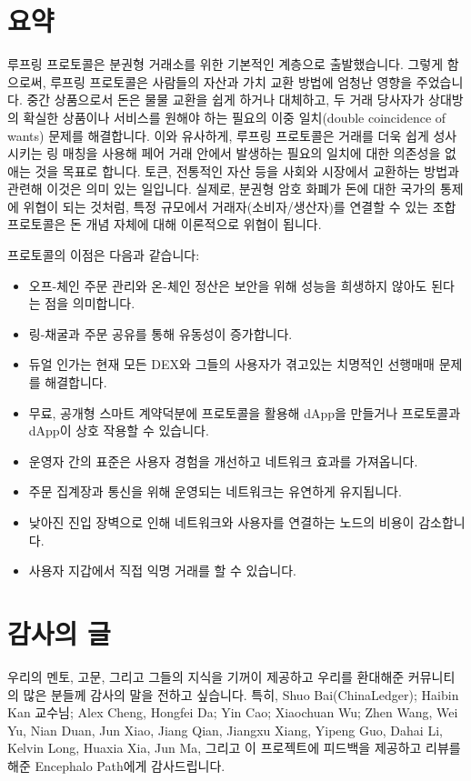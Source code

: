 \documentclass[UTF8,nofonts]{article}
\begin{document}
\begin{multicols}{2}
\section{요약}

루프링 프로토콜은 분권형 거래소를 위한 기본적인 계층으로 출발했습니다. 그렇게 함으로써, 루프링 프로토콜은 사람들의 자산과 가치 교환 방법에 엄청난 영향을 주었습니다. 중간 상품으로서 돈은 물물 교환을 쉽게 하거나 대체하고, 두 거래 당사자가 상대방의 확실한 상품이나 서비스를 원해야 하는 필요의 이중 일치(double coincidence of wants) 문제\cite{unenumerated2006}를 해결합니다. 이와 유사하게, 루프링 프로토콜은 거래를 더욱 쉽게 성사시키는 링 매칭을 사용해 페어 거래 안에서 발생하는 필요의 일치에 대한 의존성을 없애는 것을 목표로 합니다. 토큰, 전통적인 자산 등을 사회와 시장에서 교환하는 방법과 관련해 이것은 의미 있는 일입니다. 실제로, 분권형 암호 화폐가 돈에 대한 국가의 통제에 위협이 되는 것처럼, 특정 규모에서 거래자(소비자/생산자)를 연결할 수 있는 조합 프로토콜은 돈 개념 자체에 대해 이론적으로 위협이 됩니다.  

프로토콜의 이점은 다음과 같습니다:

\begin{itemize}
	\item 오프-체인 주문 관리와 온-체인 정산은 보안을 위해 성능을 희생하지 않아도 된다는 점을 의미합니다.
	\item 링-채굴과 주문 공유를 통해 유동성이 증가합니다.
	\item 듀얼 인가는 현재 모든 DEX와 그들의 사용자가 겪고있는 치명적인 선행매매 문제를 해결합니다.
	\item 무료, 공개형 스마트 계약덕분에 프로토콜을 활용해 dApp을 만들거나 프로토콜과 dApp이 상호 작용할 수 있습니다.
	\item 운영자 간의 표준은 사용자 경험을 개선하고 네트워크 효과를 가져옵니다.
	\item 주문 집계장과 통신을 위해 운영되는 네트워크는 유연하게 유지됩니다.
	\item 낮아진 진입 장벽으로 인해 네트워크와 사용자를 연결하는 노드의 비용이 감소합니다. 
	\item 사용자 지갑에서 직접 익명 거래를 할 수 있습니다.
\end{itemize}

\section{감사의 글}

우리의 멘토, 고문, 그리고 그들의 지식을 기꺼이 제공하고 우리를 환대해준 커뮤니티의 많은 분들께 감사의 말을 전하고 싶습니다. 특히, Shuo Bai(ChinaLedger); Haibin Kan 교수님; Alex Cheng, Hongfei Da; Yin Cao; Xiaochuan Wu; Zhen Wang, Wei Yu, Nian Duan, Jun Xiao, Jiang Qian, Jiangxu Xiang, Yipeng Guo, Dahai Li, Kelvin Long, Huaxia Xia, Jun Ma, 그리고 이 프로젝트에 피드백을 제공하고 리뷰를 해준 Encephalo Path에게 감사드립니다.






\end{multicols}
\end{document}
